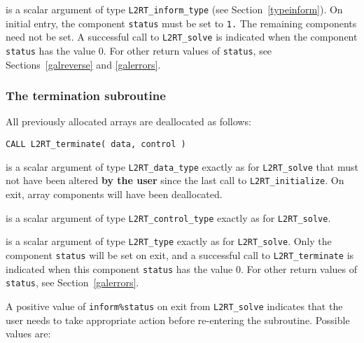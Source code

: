 \documentclass{galahad}
\newcommand{\packagename}{L2\-RT}
\begin{document}
\begin{description}
 is a scalar \intentinout argument of type
{\tt \packagename\_inform\_type}
(see Section~\ref{typeinform}).
On initial entry, the component {\tt status} must be set to {\tt 1.}
The remaining components need not be set.
A successful call to
{\tt \packagename\_solve}
is indicated when the  component {\tt status} has the value 0.
For other return values of {\tt status}, see Sections~\ref{galreverse}
and \ref{galerrors}.
\end{description}


\subsubsection{The  termination subroutine}
All previously allocated arrays are deallocated as follows:

\hskip0.5in
{\tt CALL \packagename\_terminate( data, control )}

\begin{description}

 is a scalar \intentinout argument of type
{\tt \packagename\_data\_type}
exactly as for
{\tt \packagename\_solve}
that must not have been altered {\bf by the user} since the last call to
{\tt \packagename\_initialize}.
On exit, array components will have been deallocated.

 is a scalar \intentin argument of type
{\tt \packagename\_control\_type}
exactly as for
{\tt \packagename\_solve}.

 is a scalar \intentout argument of type {\tt \packagename\_type}
exactly as for
{\tt \packagename\_solve}.
Only the component {\tt status} will be set on exit, and a
successful call to
{\tt \packagename\_terminate}
is indicated when this  component {\tt status} has the value 0.
For other return values of {\tt status}, see Section~\ref{galerrors}.

\end{description}


\galreverse
A positive value of {\tt inform\%status} on exit from
{\tt \packagename\_solve} indicates that the user needs to take appropriate
action before re-entering the subroutine. Possible values are:
\end{document}

